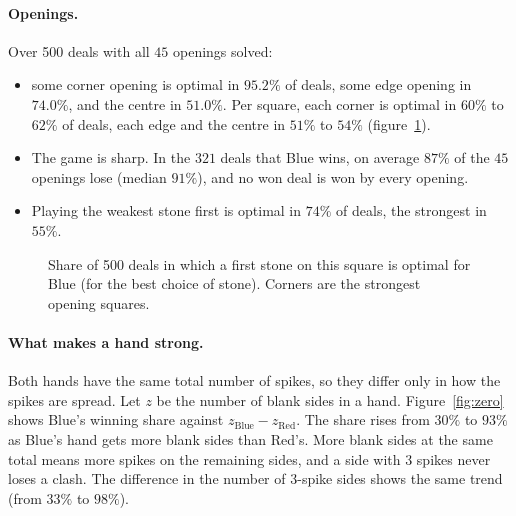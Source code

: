 \documentclass[11pt,a4paper]{article}
\begin{document}
\paragraph{Openings.} Over 500 deals with all $45$ openings solved:
\begin{itemize}
  \item some corner opening is optimal in $95.2\%$ of deals, some edge opening in $74.0\%$, and the centre in $51.0\%$. Per square, each corner is optimal in $60\%$ to $62\%$ of deals, each edge and the centre in $51\%$ to $54\%$ (figure~\ref{fig:board}).
  \item The game is sharp. In the $321$ deals that Blue wins, on average $87\%$ of the $45$ openings lose (median $91\%$), and no won deal is won by every opening.
  \item Playing the weakest stone first is optimal in $74\%$ of deals, the strongest in $55\%$.
\end{itemize}

\begin{figure}[ht]
\centering
{}
\caption{Share of 500 deals in which a first stone on this square is optimal for Blue (for the best choice of stone). Corners are the strongest opening squares.}
\label{fig:board}
\end{figure}

\paragraph{What makes a hand strong.} Both hands have the same total number of spikes, so they differ only in how the spikes are spread. Let $z$ be the number of blank sides in a hand. Figure~\ref{fig:zero} shows Blue's winning share against $z_{\text{Blue}} - z_{\text{Red}}$. The share rises from $30\%$ to $93\%$ as Blue's hand gets more blank sides than Red's. More blank sides at the same total means more spikes on the remaining sides, and a side with $3$ spikes never loses a clash. The difference in the number of $3$-spike sides shows the same trend (from $33\%$ to $98\%$).
\end{document}
